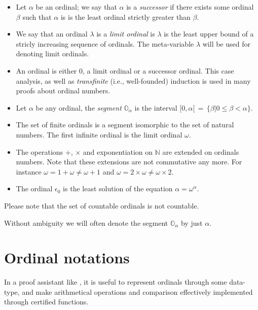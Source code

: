 \begin{itemize}
\item Let  $\alpha$ be an ordinal; we say that  $\alpha$ is a \emph{successor} if there exists some ordinal  $\beta$ such that 
$\alpha$ is is the least ordinal strictly greater than  $\beta$.

\item We say that an ordinal $\lambda$ is a \emph{limit ordinal} is $\lambda$  is the least upper bound of a stricly increasing sequence of ordinals.
The meta-variable $\lambda$ will be used for denoting  limit ordinals.

\item {}
An ordinal is either $0$, a limit ordinal or a successor ordinal. This case analysis, as well as \emph{transfinite} ({i.e.}, well-founded) induction is used in many proofs about ordinal numbers.

\item Let $\alpha$ be any ordinal, the \emph{segment} $\mathbb{O}_\alpha$ is the
interval $[0,\alpha[\,=\,\{\beta|0\leq\beta<\alpha\}$. 

\item The set  of finite ordinals is a segment isomorphic to the set of natural numbers.
 The first infinite ordinal is the limit ordinal $\omega$.
 
\item The operations $+$, $\times$ and exponentiation on $\mathbb{N}$ are extended on ordinals numbers. Note that these  extensions are not commutative any more.  For instance $\omega = 1 + \omega \not= \omega + 1$
and $\omega = 2 \times \omega \not= \omega \times 2$.

\item The ordinal $\epsilon_0$ is the least solution of the equation
 \(\alpha=\omega^{\alpha}\).
\end{itemize}


Please note that the set of countable ordinals is not countable. 

Without ambiguity we will often denote the segment $\mathbb{O}_\alpha$ by just $\alpha$.
 


\section{Ordinal notations}
In a proof assistant like \coq{},  it is useful to represent ordinals through some data-type, and make arithmetical operations and comparison effectively implemented  through certified functions.

